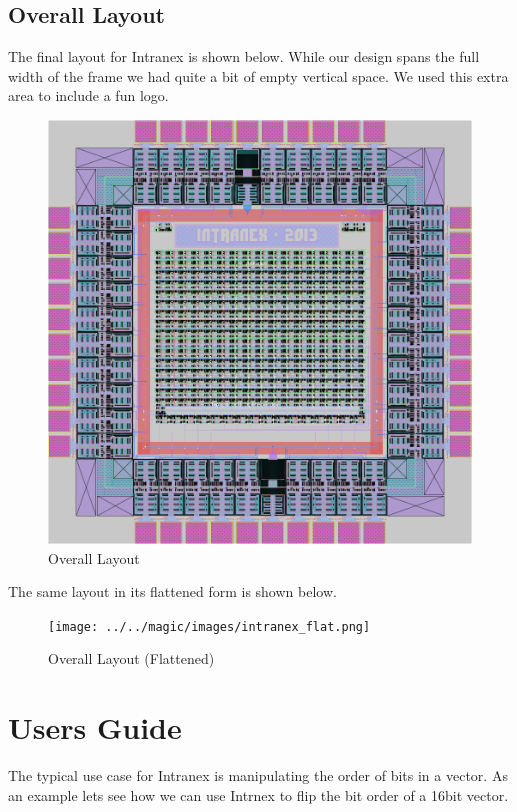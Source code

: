     \subsection{Overall Layout}
        The final layout for Intranex is shown below. While our design spans
        the full width of the frame we had quite a bit of empty vertical space.
        We used this extra area to include a fun logo.
        \begin{figure}[H]
            \centering
            \includegraphics[width=\linewidth]{../../magic/images/intranex.png}
            \caption{Overall Layout}
        \end{figure}

        \newpage
        The same layout in its flattened form is shown below.
        \begin{figure}[H]
            \centering
            \texttt{[image: ../../magic/images/intranex\_flat.png]}
            \caption{Overall Layout (Flattened)}
        \end{figure}

\newpage
\section{Users Guide}
The typical use case for Intranex is manipulating the order of bits in a
vector. As an example lets see how we can use Intrnex to flip the bit order of
a 16bit vector.

